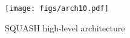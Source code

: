 
\begin{figure}[]%
\centering  
\texttt{[image: figs/arch10.pdf]}
\caption{SQUASH high-level architecture}
\label{fig:squash-overall-architecture}
\end{figure}